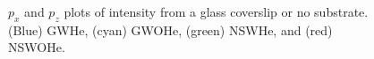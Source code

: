 \documentclass[letterpaper,12pt]{article}
\begin{document}
\begin{figure}[htbp]
	\centering
	\caption[$p_x$ and $p_z$ plots of intensity from a glasscover slip or no substrate]{$p_x$ and $p_z$ plots of intensity from a glass coverslip or no substrate. (Blue) GWHe, (cyan) GWOHe, (green) NSWHe, and (red) NSWOHe.}
\end{figure}
\newpage
\end{document}

